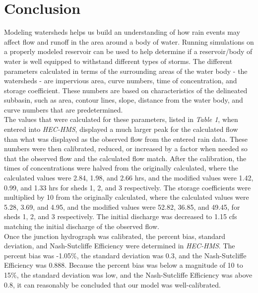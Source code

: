 \documentclass{article}
\begin{document}
\section{Conclusion}
\indent Modeling watersheds helps us build an understanding of how rain events may affect flow and runoff in the area around a body of water. Running simulations on a properly modeled reservoir can be used to help determine if a reservoir/body of water is well equipped to withstand different types of storms. The different parameters calculated in terms of the surrounding areas of the water body - the watersheds - are impervious area, curve numbers, time of concentration, and storage coefficient. These numbers are based on characteristics of the delineated subbasin, such as area, contour lines, slope, distance from the water body, and curve numbers that are predetermined. \\
\indent The values that were calculated for these parameters, listed in \emph{Table 1}, when entered into \emph{HEC-HMS}, displayed a much larger peak for the calculated flow than what was displayed as the observed flow from the entered rain data. These numbers were then calibrated, reduced, or increased by a factor when needed so that the observed flow and the calculated flow match. After the calibration, the times of concentrations were halved from the originally calculated, where the calculated values were 2.84, 1.98, and 2.66 hrs, and the modified values were 1.42, 0.99, and 1.33 hrs for sheds 1, 2, and 3 respectively. The storage coefficients were multiplied by 10 from the originally calculated, where the calculated values were 5.28, 3.69, and 4.95, and the modified values were 52.82, 36.85, and 49.45, for sheds 1, 2, and 3 respectively. The initial discharge was decreased to 1.15 cfs matching the initial discharge of the observed flow. \\
\indent Once the junction hydrograph was calibrated, the percent bias, standard deviation, and Nash-Sutcliffe Efficiency were determined in \emph{HEC-HMS}. The percent bias was -1.05\%, the standard deviation was 0.3, and the Nash-Sutcliffe Efficiency was 0.888. Because the percent bias was below a magnitude of 10 to 15\%, the standard deviation was low, and the Nash-Sutcliffe Efficiency was above 0.8, it can reasonably be concluded that our model was well-calibrated. \\
\end{document}
